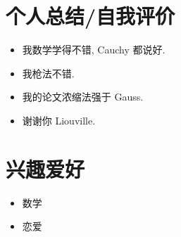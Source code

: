 \documentclass[11pt]{article}
\newlength{\iconwidth}
\begin{document}
    
    \begin{minipage}[t]{0.6\textwidth}
        \section[个人总结/自我评价]{\makebox[\iconwidth][c]{\color{primary_color}{\faAndroid}}\quad 个人总结/自我评价}
        \begin{itemize}
        \setlength{\itemsep}{0.5em}
            \item 我数学学得不错, Cauchy 都说好. 
            \item 我枪法不错. 
            \item 我的论文浓缩法强于 Gauss. 
            \item 谢谢你 Liouville. 
        \end{itemize}
    \end{minipage}
    \hfill
    \begin{minipage}[t]{0.35\textwidth}
        \section[兴趣爱好]{\makebox[\iconwidth][c]{\color{primary_color}{\faStar}}\quad 兴趣爱好}
        \begin{itemize}
        \setlength{\itemsep}{0.5em}
            \item 数学
            \item 恋爱
        \end{itemize}
    \end{minipage}
    

\end{document}
